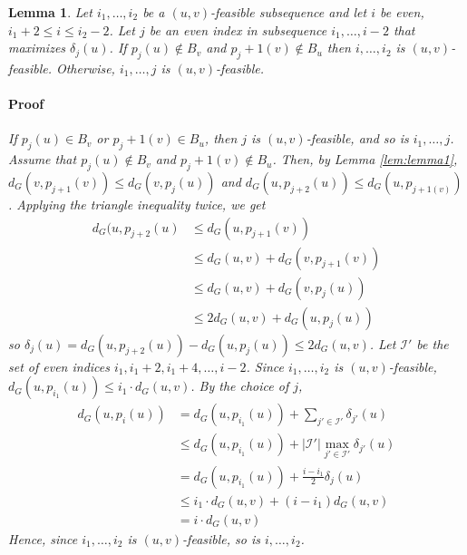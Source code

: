 \documentclass[12pt]{article}
\newtheorem{lem}[thm]{Lemma}
\begin{document}
\begin{lem}
Let $i_1, \hdots, i_2$ be a $(u,v)$-feasible subsequence and let $i$ be even, $i_1+2 \leq i \leq i_2-2$. Let $j$ be an even index in subsequence $i_1, \hdots ,i-2$ that maximizes $\delta_j(u)$. If $p_j(u) \not\in B_v$ and $p_j+1(v) \not\in B_u$ then $i, \hdots , i_2$ is $(u,v)$-feasible. Otherwise, $i_1, \hdots , j$ is $(u,v)$-feasible.

\paragraph{Proof} If $p_j(u) \in B_v$ or $p_j+1(v) \in B_u$, then $j$ is $(u,v)$-feasible, and so is $i_1, \hdots, j$. Assume that $p_j(u) \not\in B_v$ and $p_j+1(v) \not\in B_u$. Then, by Lemma \ref{lem:lemma1}, $d_G(v,p_{j+1}(v)) \leq d_G(v,p_{j}(u))$ and $d_G(u,p_{j+2}(u)) \leq d_G(u,p_{j+1(v)})$. Applying the triangle inequality twice, we get 
\begin{align*}
d_G(u,p_{j+2}(u) &\leq d_G(u,p_{j+1}(v)) \\
&\leq d_G(u,v) + d_G(v, p_{j+1}(v)) \\
&\leq d_G(u,v) + d_G(v, p_{j}(u)) \\
&\leq 2d_G(u,v) + d_G(u, p_{j}(u))
\end{align*}
so $\delta_j(u) = d_G(u,p_{j+2}(u)) - d_G(u,p_j(u)) \leq 2d_G(u,v)$. Let $\mathcal{I}'$ be the set of even indices $i_1, i_1+2, i_1+4, \hdots, i-2$. Since $i_1, \hdots, i_2$ is $(u,v)$-feasible, $d_G(u,p_{i_1}(u)) \leq i_1 \cdot d_G(u,v)$. By the choice of $j$,
\begin{align*}
d_G(u,p_{i}(u)) &= d_G(u,p_{i_1}(u)) + \sum_{j' \in \mathcal{I'}}\delta_{j'}(u) \\
&\leq d_G(u,p_{i_1}(u)) + \left| \mathcal{I'} \right| \max_{j' \in \mathcal{I'}}\delta_{j'}(u) \\
&= d_G(u,p_{i_1}(u)) + \frac{i-i_1}{2} \delta_{j}(u) \\
&\leq i_1 \cdot d_G(u,v) + (i-i_1)d_G(u,v) \\
&= i \cdot d_G(u,v)
\end{align*}
Hence, since $i_1, \hdots, i_2$ is $(u,v)$-feasible, so is $i, \hdots, i_2$.
\end{lem}
\end{document}
